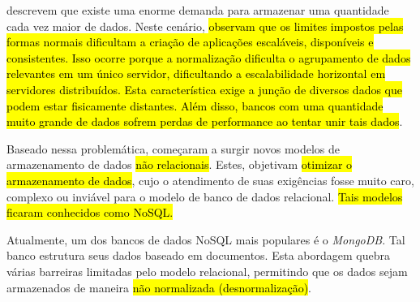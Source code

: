 
 descrevem que existe uma enorme demanda para armazenar uma quantidade cada vez maior de dados. Neste cenário,  \hl{observam que os limites impostos pelas formas normais dificultam a criação de aplicações escaláveis, disponíveis e consistentes. Isso ocorre porque a normalização dificulta o agrupamento de dados relevantes em um único servidor, dificultando a escalabilidade horizontal em servidores distribuídos. Esta característica exige a junção de diversos dados que podem estar fisicamente distantes. Além disso, bancos com uma quantidade muito grande de dados sofrem perdas de performance ao tentar unir tais dados}.

\hl{ }

Baseado nessa problemática, começaram a surgir novos modelos de armazenamento de dados \hl{não relacionais}. Estes, objetivam \hl{otimizar o armazenamento de dados}, cujo o atendimento de suas exigências fosse muito caro, complexo ou inviável para o modelo de banco de dados relacional. \hl{Tais modelos ficaram conhecidos como NoSQL.}

Atualmente, um dos bancos de dados NoSQL mais populares é o \textit{MongoDB}.
Tal banco estrutura seus dados baseado em documentos. Esta abordagem quebra várias barreiras limitadas pelo modelo relacional, permitindo que os dados sejam armazenados de maneira \hl{não normalizada (desnormalização)}.

